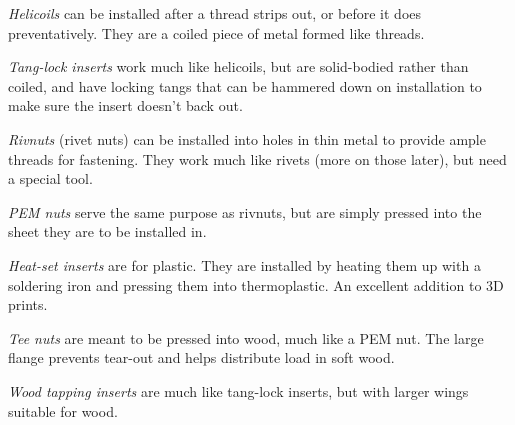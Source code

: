 	\begin{asparaenum}[a)]
		\item \textit{Helicoils} can be installed after a thread strips out, or before it does preventatively. They are a coiled piece of metal formed like threads.
		\item \textit{Tang-lock inserts} work much like helicoils, but are solid-bodied rather than coiled, and have locking tangs that can be hammered down on installation to make sure the insert doesn't back out.
		\item \textit{Rivnuts} (rivet nuts) can be installed into holes in thin metal to provide ample threads for fastening. They work much like rivets (more on those later), but need a special tool.
		\item \textit{PEM nuts} serve the same purpose as rivnuts, but are simply pressed into the sheet they are to be installed in.
		\item \textit{Heat-set inserts} are for plastic. They are installed by heating them up with a soldering iron and pressing them into thermoplastic. An excellent addition to 3D prints. 
		\item \textit{Tee nuts} are meant to be pressed into wood, much like a PEM nut. The large flange prevents tear-out and helps distribute load in soft wood.
		\item \textit{Wood tapping inserts} are much like tang-lock inserts, but with larger wings suitable for wood.
	\end{asparaenum}
	
